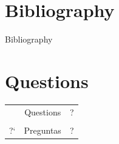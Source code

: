 \documentclass{beamer}
\begin{document}
\section{Bibliography}

\begin{frame}{Bibliography}

\renewcommand*{\bibfont}{\footnotesize}
\printbibliography{}

\end{frame}

\section{Questions}

\begin{frame}
	\Huge
	\begin{center}
	\begin{tabular}{@{}r@{}c@{}l@{}}
		&Questions&?\scalebox{.8}{?\scalebox{.8}{?\scalebox{.8}{?\scalebox{.8}{?\scalebox{.8}{?\scalebox{.8}{?}}}}}} \\
		&&\\
		\scalebox{.8}{\scalebox{.8}{\scalebox{.8}{\scalebox{.8}{\scalebox{.8}{\scalebox{.8}{?`}?`}?`}?`}?`}?`}?`&Preguntas&?\scalebox{.8}{?\scalebox{.8}{?\scalebox{.8}{?\scalebox{.8}{?\scalebox{.8}{?\scalebox{.8}{?}}}}}}
	\end{tabular}
	\end{center}
\end{frame}
\end{document}
